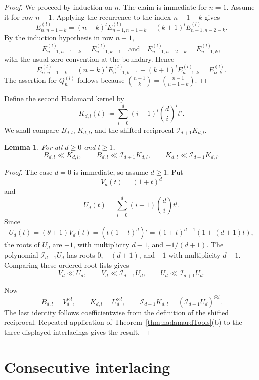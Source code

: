 \documentclass[reqno]{amsart}
\numberwithin{equation}{section}
\newtheorem{lemma}[theorem]{Lemma}
\theoremstyle{definition}
\newcommand{\had}{\odot}
\newcommand{\opI}{\mathcal{I}}
\begin{document}
\begin{proof}
We proceed by induction on $n$.  The claim is immediate for $n=1$.  Assume it
for row $n-1$.  Applying the recurrence to the index $n-1-k$ gives
\[
  E_{n,n-1-k}^{(l)}
  =
  (n-k)^lE_{n-1,n-1-k}^{(l)}
  +(k+1)^lE_{n-1,n-2-k}^{(l)}.
\]
By the induction hypothesis in row $n-1$,
\[
  E_{n-1,n-1-k}^{(l)}=E_{n-1,k-1}^{(l)}
  \quad\text{and}\quad
  E_{n-1,n-2-k}^{(l)}=E_{n-1,k}^{(l)},
\]
with the usual zero convention at the boundary.  Hence
\[
  E_{n,n-1-k}^{(l)}
  =
  (n-k)^lE_{n-1,k-1}^{(l)}
  +(k+1)^lE_{n-1,k}^{(l)}
  =
  E_{n,k}^{(l)}.
\]
The assertion for $Q_n^{(l)}$ follows because
$\binom{n-1}{k}=\binom{n-1}{n-1-k}$.
\end{proof}

Define the second Hadamard kernel by
\[
  K_{d,l}(t)\coloneqq
  \sum_{i=0}^{d}(i+1)^l\binom di^l t^i .
\]
We shall compare $B_{d,l}$, $K_{d,l}$, and the shifted reciprocal
$\opI_{d+1}K_{d,l}$.

\begin{lemma}
\label{lem:kernelInterlacings}
For all $d\geq 0$ and $l\geq 1$,
\[
  B_{d,l}\ll K_{d,l},
  \qquad
  B_{d,l}\ll \opI_{d+1}K_{d,l},
  \qquad
  K_{d,l}\ll \opI_{d+1}K_{d,l}.
\]
\end{lemma}

\begin{proof}
The case $d=0$ is immediate, so assume $d\geq 1$.  Put
\[
  V_d(t)=(1+t)^d
\]
and
\[
  U_d(t)=\sum_{i=0}^{d}(i+1)\binom di t^i.
\]
Since
\[
  U_d(t)=(\theta+1)V_d(t)=(t(1+t)^d)'
        =(1+t)^{d-1}(1+(d+1)t),
\]
the roots of $U_d$ are $-1$, with multiplicity $d-1$, and
$-1/(d+1)$.  The polynomial $\opI_{d+1}U_d$ has roots $0$,
$-(d+1)$, and $-1$ with multiplicity $d-1$.  Comparing these ordered root
lists gives
\[
  V_d\ll U_d,
  \qquad
  V_d\ll \opI_{d+1}U_d,
  \qquad
  U_d\ll \opI_{d+1}U_d.
\]

Now
\[
  B_{d,l}=V_d^{\had l},
  \qquad
  K_{d,l}=U_d^{\had l},
  \qquad
  \opI_{d+1}K_{d,l}=(\opI_{d+1}U_d)^{\had l}.
\]
The last identity follows coefficientwise from the definition of the shifted
reciprocal.  Repeated application of
Theorem~\ref{thm:hadamardTools}(b) to the three displayed interlacings gives
the result.
\end{proof}

\section{Consecutive interlacing}
\label{sec:consecutive}
\end{document}
